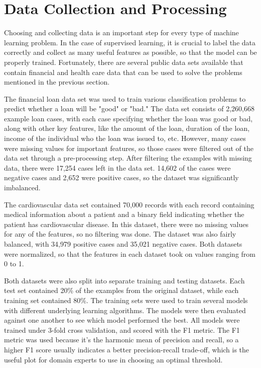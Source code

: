 \documentclass[10pt,journal,compsoc]{IEEEtran}
\begin{document}
\section{Data Collection and Processing}
Choosing and collecting data is an important step for every type of machine learning problem. In the case of supervised learning, it is crucial to label the data correctly and collect as many useful features as possible, so that the model can be properly trained. Fortunately, there are several public data sets available that contain financial and health care data that can be used to solve the problems mentioned in the previous section. 

The financial loan data set was used to train various classification problems to predict whether a loan will be "good" or "bad." The data set consists of 2,260,668 example loan cases, with each case specifying whether the loan was good or bad, along with other key features, like the amount of the loan, duration of the loan, income of the individual who the loan was issued to, etc. However, many cases were missing values for important features, so those cases were filtered out of the data set through a pre-processing step. After filtering the examples with missing data, there were 17,254 cases left in the data set. 14,602 of the cases were negative cases and 2,652 were positive cases, so the dataset was significantly imbalanced.

The cardiovascular data set contained 70,000 records with each record containing medical information about a patient and a binary field indicating whether the patient has cardiovascular disease. In this dataset, there were no missing values for any of the features, so no filtering was done. The dataset was also fairly balanced, with 34,979 positive cases and 35,021 negative cases. Both datasets were normalized, so that the features in each dataset took on values ranging from 0 to 1.

Both datasets were also split into separate training and testing datasets. Each test set contained 20\% of the examples from the original dataset, while each training set contained 80\%. The training sets were used to train several models with different underlying learning algorithms. The models were then evaluated against one another to see which model performed the best. All models were trained under 3-fold cross validation, and scored with the F1 metric. The F1 metric was used because it's the harmonic mean of precision and recall, so a higher F1 score usually indicates a better precision-recall trade-off, which is the useful plot for domain experts to use in choosing an optimal threshold.
\end{document}
